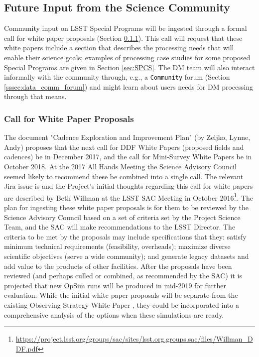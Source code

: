 \documentclass[DM,lsstdraft,toc]{lsstdoc}
\begin{document}
\subsection{Future Input from the Science Community} \label{ssec:data_comm}

Community input on LSST Special Programs will be ingested through a formal call for white paper proposals (Section \ref{sssec:data_comm_call}). This call will request that these white papers include a section that describes the processing needs that will enable their science goals; examples of processing case studies for some proposed Special Programs are given in Section \ref{sec:SPCS}. The DM team will also interact informally with the community through, e.g., a \texttt{\Large{Community}} forum (Section \ref{sssec:data_comm_forum}) and might learn about users needs for DM processing through that means.

\subsubsection{Call for White Paper Proposals}\label{sssec:data_comm_call}

The document "Cadence Exploration and Improvement Plan" (by Zeljko, Lynne, Andy) proposes that the next call for DDF White Papers (proposed fields and cadences) be in December 2017, and the call for Mini-Survey White Papers be in October 2018. At the 2017 All Hands Meeting the Science Advisory Council seemed likely to recommend these be combined into a single call. The relevant Jira issue is  and the Project's initial thoughts regarding this call for white papers are described by Beth Willman at the LSST SAC Meeting in October 2016\footnote{\url{https://project.lsst.org/groups/sac/sites/lsst.org.groups.sac/files/Willman_DDF.pdf}}. The plan for ingesting these white paper proposals is for them to be reviewed by the Science Advisory Council based on a set of criteria set by the Project Science Team, and the SAC will make recommendations to the LSST Director. The criteria to be met by the proposals may include specifications that they: satisfy minimum technical requirements (feasibility, overheads); maximize diverse scientific objectives (serve a wide community); and generate legacy datasets and add value to the products of other facilities. After the proposals have been reviewed (and perhaps culled or combined, as recommended by the SAC) it is projected that new OpSim runs will be produced in mid-2019 for further evaluation. While the initial white paper proposals will be separate from the existing Observing Strategy White Paper \citep{2017arXiv170804058L}, they could be incorporated into a comprehensive analysis of the options when these simulations are ready.
\end{document}
